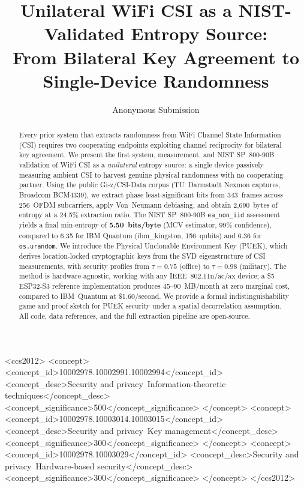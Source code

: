 \documentclass[sigconf,nonacm=false,anonymous]{acmart}
\begin{document}
\title{Unilateral WiFi CSI as a NIST-Validated Entropy Source: \\
From Bilateral Key Agreement to Single-Device Randomness}

\author{Anonymous Submission}

\begin{abstract}
Every prior system that extracts randomness from WiFi Channel State Information (CSI) requires two cooperating endpoints exploiting channel reciprocity for bilateral key agreement.
We present the first system, measurement, and NIST SP~800-90B validation of WiFi CSI as a \emph{unilateral} entropy source: a single device passively measuring ambient CSI to harvest genuine physical randomness with no cooperating partner.
Using the public Gi-z/CSI-Data corpus (TU~Darmstadt Nexmon captures, Broadcom BCM4339), we extract phase least-significant bits from 343~frames across 256~OFDM subcarriers, apply Von~Neumann debiasing, and obtain 2,690~bytes of entropy at a 24.5\% extraction ratio.
The NIST SP~800-90B \texttt{ea\_non\_iid} assessment yields a final min-entropy of \textbf{5.50~bits/byte} (MCV estimator, 99\% confidence), compared to 6.35 for IBM Quantum (ibm\_kingston, 156~qubits) and 6.36 for \texttt{os.urandom}.
We introduce the Physical Unclonable Environment Key (PUEK), which derives location-locked cryptographic keys from the SVD eigenstructure of CSI measurements, with security profiles from $\tau=0.75$ (office) to $\tau=0.98$ (military).
The method is hardware-agnostic, working with any IEEE~802.11n/ac/ax device; a \$5 ESP32-S3 reference implementation produces 45--90~MB/month at zero marginal cost, compared to IBM~Quantum at \$1.60/second.
We provide a formal indistinguishability game and proof sketch for PUEK security under a spatial decorrelation assumption.
All code, data references, and the full extraction pipeline are open-source.
\end{abstract}

\begin{CCSXML}
<ccs2012>
<concept>
<concept_id>10002978.10002991.10002994</concept_id>
<concept_desc>Security and privacy~Information-theoretic techniques</concept_desc>
<concept_significance>500</concept_significance>
</concept>
<concept>
<concept_id>10002978.10003014.10003015</concept_id>
<concept_desc>Security and privacy~Key management</concept_desc>
<concept_significance>300</concept_significance>
</concept>
<concept>
<concept_id>10002978.10003029</concept_id>
<concept_desc>Security and privacy~Hardware-based security</concept_desc>
<concept_significance>300</concept_significance>
</concept>
</ccs2012>
\end{CCSXML}
\end{document}
